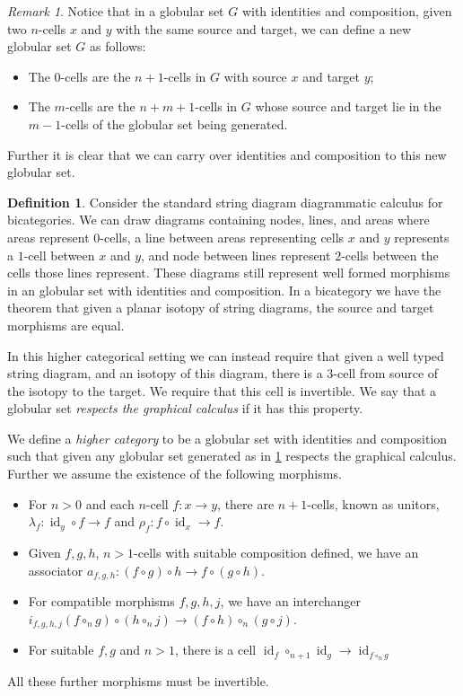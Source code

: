 \documentclass{article}
\renewcommand{\comment}[1]{\todo[color=green!40]{#1}}
\theoremstyle{definition}
\newtheorem{definition}{Definition}
\theoremstyle{remark}
\newtheorem{remark}{Remark}
\DeclareMathOperator{\id}{id}
\begin{document}
\begin{remark}\label{descendants}
  Notice that in a globular set \(G\) with identities and composition, given two \(n\)-cells \(x\) and \(y\) with the same source and target, we can define a new globular set \(G\) as follows:
  \begin{itemize}
  \item The \(0\)-cells are the \(n+1\)-cells in \(G\) with source \(x\) and target \(y\);
  \item The \(m\)-cells are the \(n+m+1\)-cells in \(G\) whose source and target lie in the \(m-1\)-cells of the globular set being generated.
  \end{itemize}
  Further it is clear that we can carry over identities and composition to this new globular set.
\end{remark}



\begin{definition}\label{def:higher-cat}
  Consider the standard string diagram diagrammatic calculus for bicategories. We can draw diagrams containing nodes, lines, and areas where areas represent \(0\)-cells, a line between areas representing cells \(x\) and \(y\) represents a \(1\)-cell between \(x\) and \(y\), and node between lines represent \(2\)-cells between the cells those lines represent. These diagrams still represent well formed morphisms in an globular set with identities and composition. In a bicategory we have the theorem that given a planar isotopy of string diagrams, the source and target morphisms are equal.

  In this higher categorical setting we can instead require that given a well typed string diagram, and an isotopy of this diagram, there is a \(3\)-cell from source of the isotopy to the target. We require that this cell is invertible. We say that a globular set \emph{respects the graphical calculus} if it has this property.

  We define a \emph{higher category}\comment{Call this a higher precategory?} to be a globular set with identities and composition such that given any globular set generated as in \cref{descendants} respects the graphical calculus. Further we assume the existence of the following morphisms.
  \begin{itemize}
  \item For \(n>0\) and each \(n\)-cell \(f: x \to y\), there are \(n+1\)-cells, known as unitors, \(\lambda_f: \id_y \circ f \to f\) and \(\rho_f: f \circ \id_x \to f\).
  \item Given \(f,g,h\), \(n>1\)-cells with suitable composition defined, we have an associator \(a_{f,g,h} : (f \circ g) \circ h \to f \circ (g \circ h)\).
  \item For compatible morphisms \(f,g,h,j\), we have an interchanger \(i_{f,g,h,j}(f \circ_n g) \circ (h \circ_n j) \to (f \circ h) \circ_n (g \circ j)\).
  \item For suitable \(f,g\) and \(n > 1\), there is a cell \(\id_f \circ_{n+1} \id_g \to \id_{f \circ_n g}\)
  \end{itemize}
  All these further morphisms must be invertible.
\end{definition}
\end{document}
